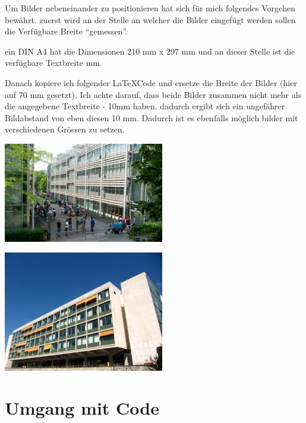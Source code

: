Um Bilder nebeneinander zu positionieren hat sich für mich folgendes Vorgehen bewährt. zuerst wird an der Stelle an welcher die Bilder eingefügt werden sollen die Verfügbare Breite "`gemessen"'.

\noindent
ein DIN A4 hat die Dimensionen 210 mm x 297 mm und an dieser Stelle ist die verfügbare Textbreite  mm.

Danach kopiere ich folgender \LaTeX Code und ersetze die Breite der Bilder (hier auf 70 mm gesetzt). Ich achte darauf, dass beide Bilder zusammen nicht mehr als die angegebene Textbreite - 10mm haben. dadurch ergibt sich ein ungefährer Bildabstand von eben diesen 10 mm. Dadurch ist es ebenfalls möglich bilder mit verschiedenen Grössen zu setzen.

\noindent
\begin{minipage}{0.45\linewidth}
	\centering
	\includegraphics[width=70mm]{Kapitel/Bilder/gibbBmSchulhausMitSchuelern}
	\label{fig:Testbild1}
\end{minipage}\hfill
\begin{minipage}{0.45\linewidth}
	\includegraphics[width=70mm]{Kapitel/Bilder/gibbHauptgebaude}
	\label{fig:Testbild2}	
\end{minipage}

\section{Umgang mit Code}

